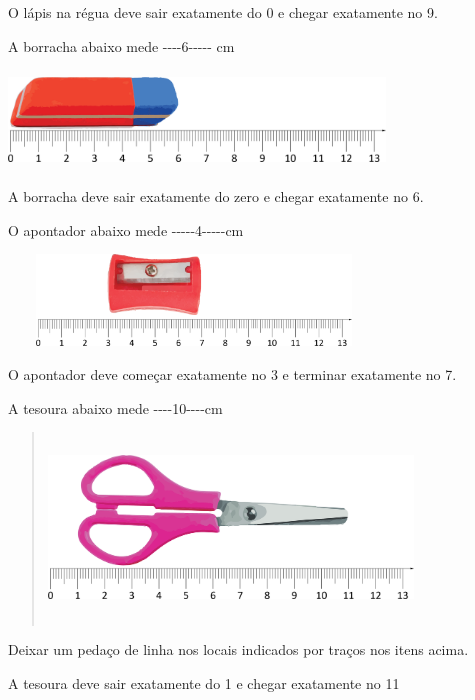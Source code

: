 \begin{escolha}
\begin{escolha}
  O lápis na régua deve sair exatamente do 0 e chegar exatamente no 9.


\item
  A borracha abaixo mede -\/-\/-\/-6-\/-\/-\/-\/- cm

  \includegraphics[width=3.93367in,height=1.02509in]{media/image43.png}

  A borracha deve sair exatamente do zero e chegar exatamente no 6.

\item
  O apontador abaixo mede -\/-\/-\/-\/-4-\/-\/-\/-\/-cm

  \includegraphics[width=3.87534in,height=0.95842in]{media/image44.png}

  O apontador deve começar exatamente no 3 e terminar exatamente no 7.

\item
  A tesoura abaixo mede -\/-\/-\/-10-\/-\/-\/-cm

  \begin{quote}
  \includegraphics[width=3.81700in,height=1.97517in]{media/image45.png}
\end{quote}

  Deixar um pedaço de linha nos locais indicados por traços nos itens
acima.

  A tesoura deve sair exatamente do 1 e chegar exatamente no 11
\end{escolha}



\end{escolha}
